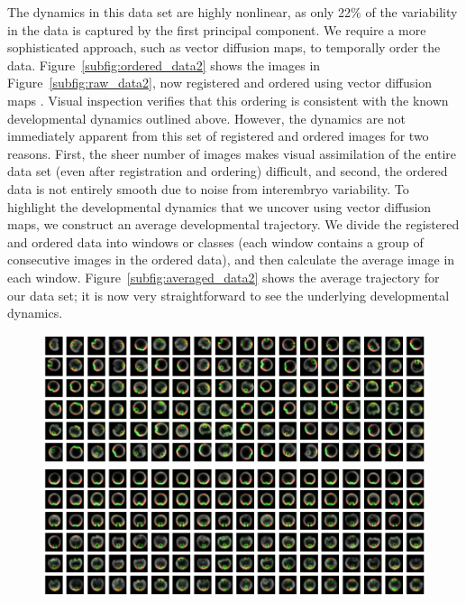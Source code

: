 \documentclass{pnastwo}
\begin{document}
\begin{article}
The dynamics in this data set are highly nonlinear, as only 22\% of the variability in the data is captured by the first principal component.
%
We require a more sophisticated approach, such as vector diffusion maps, to temporally order the data.
%
Figure~\ref{subfig:ordered_data2} shows the images in Figure~\ref{subfig:raw_data2}, now registered and ordered using vector diffusion maps \cite{singer2012vector}.
%
Visual inspection verifies that this ordering is consistent with the known developmental dynamics outlined above.
%
However, the dynamics are not immediately apparent from this set of registered and ordered images for two reasons.
%
First, the sheer number of images makes visual assimilation of the entire data set (even after registration and ordering) difficult, and
second, the ordered data is not entirely smooth due to noise from interembryo variability.
%
To highlight the developmental dynamics that we uncover using vector diffusion maps, we construct an average developmental trajectory.
%
We divide the registered and ordered data into windows or classes (each window contains a group of consecutive images in the ordered data), and then calculate the average image in each window.
%
Figure~\ref{subfig:averaged_data2} shows the average trajectory for our data set; it is now very straightforward to see the underlying developmental dynamics.

\begin{figure}[t]
\includegraphics[width=16.8cm]{raw_data2}

\vspace{0.2cm}
\includegraphics[width=16.8cm]{VDM_ordered}


\end{figure}
\end{article}
\end{document}
